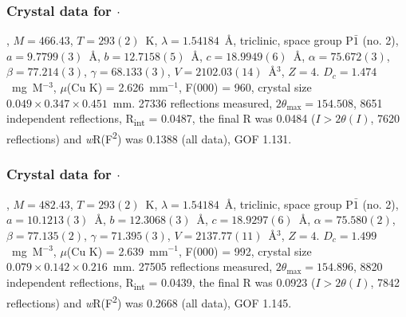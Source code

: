 \begin{refsection}
\subsubsection{Crystal data for \texorpdfstring{$\cdot$}{C24 H25 N3 O2 Se}}
, $M=466.43$, $T=293(2)$~K, $\lambda=1.54184$~\AA, triclinic, space group P$\bar{1}$ (no. 2), $a = 9.7799(3)$~\AA, $b = 12.7158(5)$~\AA, $c = 18.9949(6)$~\AA, $\alpha = 75.672(3)$\degree, $\beta = 77.214(3)$\degree, $\gamma = 68.133(3)$\degree, $V = 2102.03(14)$~\AA$^{3}$, $Z = 4$. $D_{c}= 1.474$~mg~M$^{-3}$, $\mu$(Cu K\a) = 2.626~mm$^{-1}$, F(000) = 960, crystal size $0.049 \times 0.347 \times 0.451$~mm. 27336 reflections measured, $2\theta_{\mathrm{max}}=154.508$\degree, 8651 independent reflections, R\textsubscript{int} = 0.0487, the final R was 0.0484 ($I > 2\theta(I)$, 7620 reflections) and \emph{w}R(F\textsuperscript{2}) was 0.1388 (all data), GOF 1.131.

\subsubsection{Crystal data for \texorpdfstring{$\cdot$}{C24 H25 N3 O3 Se}}
, $M=482.43$, $T=293(2)$~K, $\lambda=1.54184$~\AA, triclinic, space group P$\bar{1}$ (no. 2), $a = 10.1213(3)$~\AA, $b = 12.3068(3)$~\AA, $c = 18.9297(6)$~\AA, $\alpha = 75.580(2)$\degree, $\beta = 77.135(2)$\degree, $\gamma = 71.395(3)$\degree, $V = 2137.77(11)$~\AA$^{3}$, $Z = 4$. $D_{c}= 1.499$~mg~M$^{-3}$, $\mu$(Cu K\a) = 2.639~mm$^{-1}$, F(000) = 992, crystal size $0.079 \times 0.142 \times 0.216$~mm. 27505 reflections measured, $2\theta_{\mathrm{max}}=154.896$\degree, 8820 independent reflections, R\textsubscript{int} = 0.0439, the final R was 0.0923 ($I > 2\theta(I)$, 7842 reflections) and \emph{w}R(F\textsuperscript{2}) was 0.2668 (all data), GOF 1.145.

\printbibliography[heading=subbibliography]
\end{refsection}
